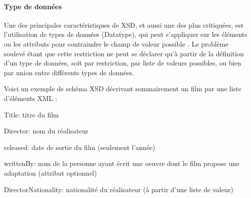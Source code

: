 \paragraph{Type de données}
Une des principales caractéristiques de XSD, et aussi une des plus critiquées, est l'utilisation de types de données (Datatype), qui peut s'appliquer sur les éléments ou les attributs pour contraindre le champ de valeur possible .
Le problème soulevé étant que cette restriction ne peut se déclarer qu'à partir de la définition d'un type de données, soit par restriction, par liste de valeurs possibles, ou bien par union entre différents types de données.


Voici un exemple de schéma XSD décrivant sommairement un film par une liste d'éléments XML : 
\begin{liste}
	\item Title: titre du film
	\item Director: nom du réalisateur
	\item released: date de sortie du film (seulement l'année)
	\item writtenBy: nom de la personne ayant écrit une oeuvre dont le film propose une adaptation (attribut optionnel)
	\item DirectorNationality: nationalité du réalisateur (à partir d'une liste de valeur)
\end{liste}

